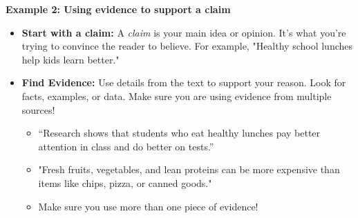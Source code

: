 \documentclass[12pt]{article}
\begin{document}
\vspace{.5em}


\begin{tcolorbox}[colframe=black!60, colback=white, 
coltitle=black, colbacktitle=black!15, fonttitle=\bfseries\Large, 
title=Examples, halign title=center, left=10pt, right=10pt, top=10pt, bottom=15pt]

\textbf{Example 2: Using evidence to support a claim}
\begin{itemize}
    \item \textbf{Start with a claim:} A \textit{claim} is your main idea or opinion. It’s what you’re trying to convince the reader to believe. For example, "Healthy school lunches help kids learn better."
    \end{itemize}
  \begin{itemize}
                      \item \textbf{Find Evidence:} Use details from the text to support your reason. Look for facts, examples, or data. Make sure you are using evidence from multiple sources!
                      \begin{itemize}
                          \item “Research shows that students who eat healthy lunches pay better attention in class and do better on tests.”
                          \item "Fresh fruits, vegetables, and lean proteins can be more expensive than items like chips, pizza, or canned goods."
                          \item Make sure you use more than one piece of evidence!
                      \end{itemize}
                    
     \end{itemize}                  
                     
    




\end{tcolorbox}
\end{document}
